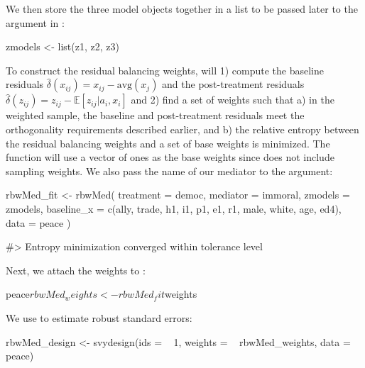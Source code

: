 We then store the three model objects together in a list to be passed
later to the  argument in :

\begin{Schunk}
\begin{Sinput}
zmodels <- list(z1, z2, z3)
\end{Sinput}
\end{Schunk}

To construct the residual balancing weights,  will 1)
compute the baseline residuals
\(\hat{\delta}(x_{ij})=x_{ij}-\text{avg}({x}_{j})\) and the
post-treatment residuals
\(\hat{\delta}(z_{ij})=z_{ij}-\mathbb{E}[z_{ij}|a_{i},x_{i}]\) and 2)
find a set of weights such that a) in the weighted sample, the baseline
and post-treatment residuals meet the orthogonality requirements
described earlier, and b) the relative entropy between the residual
balancing weights and a set of base weights is minimized. The function
will use a vector of ones as the base weights since  does
not include sampling weights. We also pass the name of our mediator to
the  argument:

\begin{Schunk}
\begin{Sinput}
rbwMed_fit <- rbwMed(
  treatment = democ,
  mediator = immoral,
  zmodels = zmodels,
  baseline_x = c(ally, trade, h1, i1,
                 p1, e1, r1, male, white, age, ed4),
  data = peace
)
\end{Sinput}
\begin{Soutput}
#> Entropy minimization converged within tolerance level
\end{Soutput}
\end{Schunk}

Next, we attach the weights to :

\begin{Schunk}
\begin{Sinput}
peace$rbwMed_weights <- rbwMed_fit$weights
\end{Sinput}
\end{Schunk}

We use  to estimate robust standard errors:

\begin{Schunk}
\begin{Sinput}
rbwMed_design <- svydesign(ids = ~ 1,
                           weights = ~ rbwMed_weights,
                           data = peace)
\end{Sinput}
\end{Schunk}


